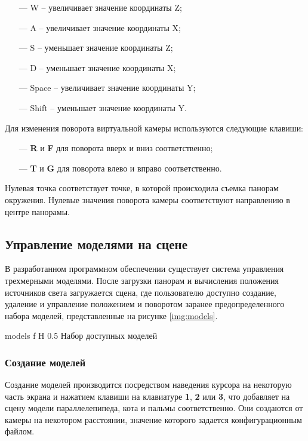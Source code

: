 \begin{itemize}
	\item[---] W -- увеличивает значение координаты Z;
	\item[---] A -- увеличивает значение координаты X;
	\item[---] S -- уменьшает значение координаты Z;
	\item[---] D -- уменьшает значение координаты X;
	\item[---] Space -- увеличивает значение координаты Y;
	\item[---] Shift -- уменьшает значение координаты Y.
\end{itemize}

Для изменения поворота виртуальной камеры используются следующие клавиши:

\begin{itemize}
	\item[---] \textbf{R} и \textbf{F} для поворота вверх и вниз соответственно;
	\item[---] \textbf{T} и \textbf{G} для поворота влево и вправо соответственно.
\end{itemize}

Нулевая точка соответствует точке, в которой происходила съемка панорам окружения. Нулевые значения поворота камеры соответствуют направлению в центре панорамы.

\subsection{Управление моделями на сцене}

В разработанном программном обеспечении существует система управления трехмерными моделями. После загрузки панорам и вычисления положения источников света загружается сцена, где пользователю доступно создание, удаление и управление положением и поворотом заранее предопределенного набора моделей, представленные на рисунке \ref{img:models}. 

{models}
{f}
{H}
{0.5\textwidth}
{Набор доступных моделей}

\subsubsection*{Создание моделей}

Создание моделей производится посредством наведения курсора на некоторую часть экрана и нажатием клавиши на клавиатуре \textbf{1}, \textbf{2} или \textbf{3}, что добавляет на сцену модели параллелепипеда, кота и пальмы соответственно. Они создаются от камеры на некотором расстоянии, значение которого задается конфигурационным файлом.

